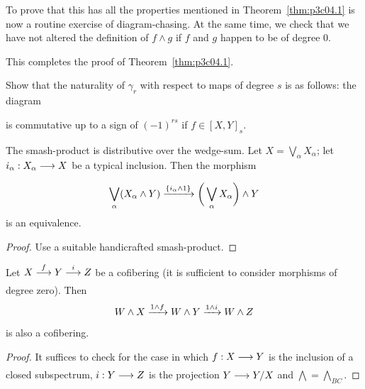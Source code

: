 \documentclass[../main]{subfiles}
\begin{document}
To prove that this has all the properties mentioned in Theorem~\ref{thm:p3c04.1} is now a routine exercise of diagram-chasing. At the same time, we check that we have not altered the definition of $f \wedge g$ if $f$ and $g$ happen to be of degree $0$. 


This completes the proof of Theorem~\ref{thm:p3c04.1}.

\begin{exercise}
Show that the naturality of $\gamma_r$ with respect to maps of degree $s$ is as follows: the diagram 

\begin{center}
\end{center}

is commutative up to a sign of $(-1)^{rs}$ if $f \in [X, Y]_s$.
\end{exercise}

\begin{proposition}\label{prop:p3ch04.11}
The smash-product is distributive over the wedge-sum. Let $X = \bigvee_\alpha X_\alpha$; let $i_\alpha : X_\alpha \lar{} X$ be a typical inclusion. Then the morphism \[\bigvee_\alpha (X_\alpha \wedge Y) \vra{\{i_\alpha \wedge 1\}} \bigg(\bigvee_\alpha X_\alpha\bigg) \wedge Y\] is an equivalence. 
\end{proposition}

\begin{proof}
Use a suitable handicrafted smash-product. 
\end{proof}

\begin{proposition}\label{prop:p3ch04.12}
Let $X \lar{f} Y \lar{i} Z$ be a cofibering (it is sufficient to consider morphisms of degree zero). Then \[W \wedge X \vra{1 \wedge f} W \wedge Y \vra{1 \wedge i} W \wedge Z\] is also a cofibering.
\end{proposition}

\begin{proof}
It suffices to check for the case in which $f : X \lar{} Y$ is the inclusion of a closed subspectrum, $i : Y \lar{} Z$ is the projection $Y \lar {} Y/X$ and $\bigwedge = \bigwedge_{BC}$.
\end{proof}
\end{document}
